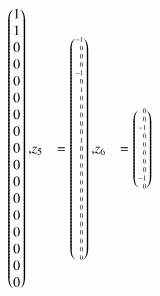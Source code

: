 \begin{beispiel}
\begin{align*}
\begin{pmatrix*}[r]
 1\\
 1\\
 0\\
 0\\
 0\\
 0\\
 0\\
 0\\
 0\\
 0\\
 0\\
 0\\
 0\\
 0\\
 0\\
 0\\
 0
\end{pmatrix*},
&z_5 %
&=
\tiny
\begin{pmatrix*}[r]
-1\\
 0\\
 0\\
 0\\
-1\\
 0\\
 1\\
 0\\
 0\\
 0\\
 0\\
 0\\
 1\\
 0\\
 0\\
 0\\
 0\\
 0\\
 0\\
 0\\
 0\\
 0\\
 0\\
 0\\
 0\\
 0\\
 0
\end{pmatrix*},
&z_6 %
&=
\tiny
\begin{pmatrix*}[r]
 0\\
 0\\
-1\\
 0\\
 0\\
 0\\
 0\\
 0\\
-1\\
 0\\

\end{pmatrix*}
\end{align*}
\end{beispiel}
